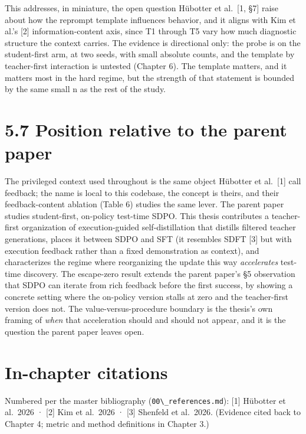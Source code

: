 This addresses, in miniature, the open question Hübotter et al.~{[}1, §7{]} raise about how the reprompt template influences behavior, and it aligns with Kim et al.'s {[}2{]} information-content axis, since T1 through T5 vary how much diagnostic structure the context carries. The evidence is directional only: the probe is on the student-first arm, at two seeds, with small absolute counts, and the template by teacher-first interaction is untested (Chapter 6). The template matters, and it matters most in the hard regime, but the strength of that statement is bounded by the same small n as the rest of the study.

\section{5.7 Position relative to the parent paper}\label{position-relative-to-the-parent-paper}

The privileged context used throughout is the same object Hübotter et al.~{[}1{]} call feedback; the name is local to this codebase, the concept is theirs, and their feedback-content ablation (Table 6) studies the same lever. The parent paper studies student-first, on-policy test-time SDPO. This thesis contributes a teacher-first organization of execution-guided self-distillation that distills filtered teacher generations, places it between SDPO and SFT (it resembles SDFT {[}3{]} but with execution feedback rather than a fixed demonstration as context), and characterizes the regime where reorganizing the update this way \emph{accelerates} test-time discovery. The escape-zero result extends the parent paper's §5 observation that SDPO can iterate from rich feedback before the first success, by showing a concrete setting where the on-policy version stalls at zero and the teacher-first version does not. The value-versus-procedure boundary is the thesis's own framing of \emph{when} that acceleration should and should not appear, and it is the question the parent paper leaves open.

\section{In-chapter citations}\label{in-chapter-citations}

Numbered per the master bibliography (\passthrough{\lstinline!00\_references.md!}): {[}1{]} Hübotter et al.~2026 · {[}2{]} Kim et al.~2026 · {[}3{]} Shenfeld et al.~2026. (Evidence cited back to Chapter 4; metric and method definitions in Chapter 3.)

